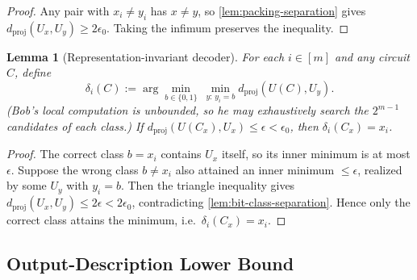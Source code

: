 \documentclass[aps,prx,reprint,floatfix,superscriptaddress]{revtex4-2}
\newtheorem{lemma}{Lemma}
\begin{document}
\begin{proof}
Any pair with $x_i \neq y_i$ has $x \neq y$, so
\cref{lem:packing-separation} gives $d_{\mathrm{proj}}(U_x, U_y) \geq 2\epsilon_0$.
Taking the infimum preserves the inequality.
\end{proof}

\begin{lemma}[Representation-invariant decoder]
\label{lem:decoder}
For each $i \in [m]$ and any circuit $C$, define
\begin{equation}\label{eq:decoder}
\delta_i(C) :=
\arg\min_{b \in \{0,1\}}\ \min_{y:\, y_i = b} d_{\mathrm{proj}}(U(C), U_y).
\end{equation}
(Bob's local computation is unbounded, so he may exhaustively search the
$2^{m-1}$ candidates of each class.) If
$d_{\mathrm{proj}}(U(C_x), U_x) \leq \epsilon < \epsilon_0$, then
$\delta_i(C_x) = x_i$.
\end{lemma}

\begin{proof}
The correct class $b = x_i$ contains $U_x$ itself, so its inner minimum is
at most $\epsilon$. Suppose the wrong class $b \neq x_i$ also attained an
inner minimum $\leq \epsilon$, realized by some $U_y$ with $y_i = b$. Then
the triangle inequality gives
$d_{\mathrm{proj}}(U_x, U_y) \leq 2\epsilon < 2\epsilon_0$, contradicting
\cref{lem:bit-class-separation}. Hence only the correct class attains the
minimum, i.e.\ $\delta_i(C_x) = x_i$.
\end{proof}

\subsection{Output-Description Lower Bound}
\end{document}
